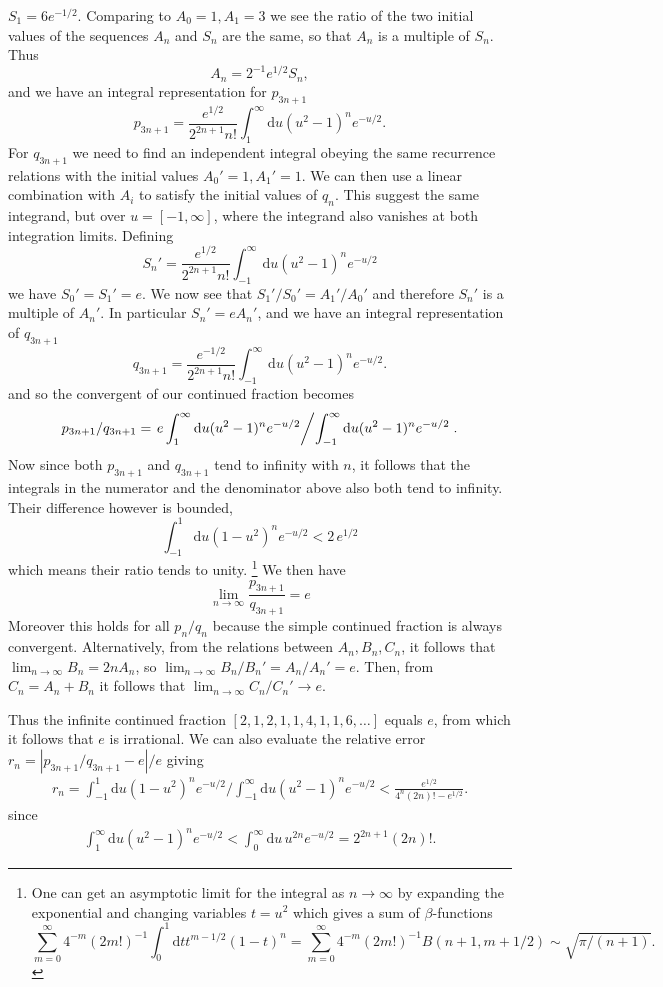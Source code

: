 \documentclass{article}
\theoremstyle{theorem}
\theoremstyle{definition}
\begin{document}
$S_1 = 6 e^{-1/2}$.
Comparing to $A_0 = 1, A_1 = 3$ we see the ratio of the two initial values of the sequences $A_n$ and $S_n$ are the same, so that $A_n$ is a multiple of $S_n$. Thus
$$ A_n = 2^{-1}e^{1/2} S_n, $$
and we have an integral representation for $p_{3n+1}$
$$ p_{3n+1} = \frac { e^{1/2}} {2^{2n+1} n!} \int_1^\infty \textrm{d}u (u^2 - 1)^n e^{-u/2}.$$
For $q_{3n+1}$ we need to find an independent integral obeying the same recurrence relations with the initial values $A_0' = 1, A_1' = 1$. We can then use a linear combination with $A_i$ to satisfy the initial values of $q_n$. This suggest the same integrand, but over $u = [-1, \infty]$, where the integrand also vanishes at both integration limits. Defining
$$ S_n' = \frac { e^{1/2}} {2^{2n+1} n!} \int_{-1}^\infty \textrm{d}u (u^2 - 1)^n e^{-u/2}$$
we have
$S_0' = S_1' =e$.
We now see that $S_1'/S_0' = A_1'/A_0'$ and therefore $S_n'$ is a multiple of $A_n'$. In particular $S_n' = e A_n'$, and we have an integral representation of $q_{3n+1}$
$$
	q_{3n+1} 
	= \frac { e^{-1/2}} {2^{2n+1} n!} \int_{-1}^\infty \textrm{d}u (u^2 - 1)^n e^{-u/2}.   
$$   
and so the convergent of our continued fraction becomes 
$$ p_{3n+1}/q_{3n+1} = \left. e \int_{1}^\infty \textrm{d}u (u^2 - 1)^n e^{-u/2} \middle / \int_{-1}^\infty \textrm{d}u (u^2 - 1)^n e^{-u/2} \right. . $$
Now since both $p_{3n+1}$ and $q_{3n+1}$ tend to infinity with $n$, it follows that the integrals in the numerator and the denominator above also both tend to infinity. Their difference however is bounded, 
$$
 \int_{-1}^1 \textrm{d}u (1-u^2 )^n e^{-u/2}  < 2 \, e^{1/2}
$$
which means their ratio tends to unity.
\footnote{One can get an asymptotic limit for the integral as $n \rightarrow \infty$ by expanding the exponential and changing variables $t=u^2$ which gives a sum of $\beta$-functions
$$\sum_{m=0}^\infty  4^{-m} (2m!)^{-1} \int_0^1 \textrm{d}t  t^{m-1/2}(1-t)^n =
\sum_{m=0}^\infty 4^{-m} (2m!)^{-1}B(n+1,m+1/2) \sim \sqrt{\pi/(n+1)}.
$$
}
We then have 
$$ \lim_{n \to \infty} \frac{p_{3n+1}}{q_{3n+1}} = e $$
Moreover this holds for all $p_n/q_n$ because the simple continued fraction is always convergent. Alternatively, from the relations between $A_n, B_n, C_n$, it follows that $\lim_{n \rightarrow \infty} B_n =  2nA_n$, so $\lim_{n \rightarrow \infty}B_n/B_n' = A_n/A_n' = e$. Then, from  $C_n = A_n + B_n$ it follows that $\lim_{n \rightarrow \infty} C_n/C_n'  \rightarrow e$. 

Thus the infinite continued fraction $[2, 1, 2, 1, 1, 4, 1, 1, 6, \ldots]$ equals $e$, from which it follows that $e$ is irrational. We can also evaluate the relative error $r_n=|p_{3n+1}/ q_{3n+1} - e |/e$ giving
\begin{eqnarray*}
r_n = \int_{-1}^1 \textrm{d}u (1 - u^2)^n e^{-u/2} /  \int_{-1}^\infty \textrm{d}u (u^2 - 1)^n e^{-u/2} 
 <  \frac{ e^{1/2}}{4^{n} (2n)!- e^{1/2}}.
\end{eqnarray*}
since
\begin{eqnarray*}
\int_{1}^\infty \textrm{d}u (u^2 - 1)^n e^{-u/2} 
<\int_0^\infty \textrm{d}u \, u^{2n} e^{-u/2} = 2^{2n+1}(2n)!.
\end{eqnarray*}
\end{document}
